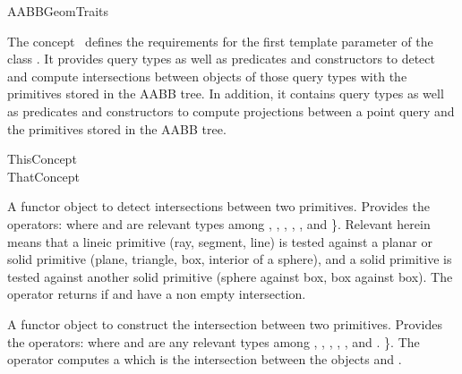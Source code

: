 \ccRefPageBegin


\begin{ccRefConcept}{AABBGeomTraits}


\ccDefinition
  
The concept \ccRefName\ defines the requirements for the first template parameter of the class . It provides query types as well as predicates and constructors to detect and compute intersections between objects of those query types with the primitives stored in the AABB tree. In addition, it contains query types as well as predicates and constructors to compute projections between a point query and the primitives stored in the AABB tree.

\ccGeneralizes

ThisConcept \\
ThatConcept

\ccTypes



{A functor object to detect intersections between two primitives.
Provides the operators:
where  and  are relevant types
among , , , , ,  and  \}. Relevant herein means that a lineic primitive (ray, segment, line) is tested against a planar or solid primitive (plane, triangle, box, interior of a sphere), and a solid primitive is tested against another solid primitive (sphere against box, box against box). The operator returns  if   and 
have a non empty intersection.}

{A functor object to construct the intersection between two primitives.
Provides the operators:
where  and  are any relevant types
among , , ,  , ,  and . \}.
The operator computes a  which is the intersection between the objects  and .}


\end{ccRefConcept}
